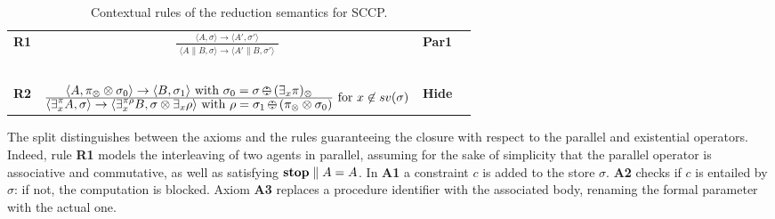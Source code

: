 \documentclass{llncs}
\newcommand{\ostop}{{\bf stop}}
\newcommand{\rarrow}{\rightarrow}
\def\odiv{\, {\ominus\hspace{-7.7pt} \div} \,}
\begin{document}
\begin{table}  %
   \begin{center}
   \begin{tabular}{lcll} 
  \mbox{\bf R1}& $\frac {\displaystyle \langle A, \sigma\rangle \to \langle A', \sigma' \rangle} 
  {\displaystyle \begin{array}{l}
                          \langle A\parallel B, \sigma \rangle \to \langle A'\parallel B, \sigma' \rangle
                          \end{array}}$ 
    & \bf{Par1}&
  \\
  & \mbox{   }&\mbox{   }&
  \\
    \mbox{\bf R2}& $\frac {\displaystyle \langle A, \pi_\otimes \otimes \sigma_0 \rangle
    \to \langle B, \sigma_1 \rangle \text{ with } \sigma_0 = \sigma \odiv (\exists_x \pi)_\otimes}
    {\displaystyle\langle \exists^{\pi}_x A,\sigma\rangle \to \langle 
    \exists^{\pi \rho}_x B, \sigma \otimes \exists_x \rho
    \rangle \text{ with } \rho = \sigma_1 \odiv (\pi_\otimes \otimes \sigma _0)} \text{ for } x \not \in sv(\sigma)$
    &\bf{Hide}&
  \end{tabular}
  \end{center}
\caption{Contextual rules of the reduction semantics for SCCP.}
\label{fig:operational2}
\end{table}

The split distinguishes between the axioms and the rules guaranteeing the closure with respect to the parallel and existential operators. Indeed, rule {\bf  R1} models the interleaving of two agents in parallel, assuming for the sake of simplicity
that the parallel operator is associative and commutative, as well as satisfying $ \hbox{\ostop} \parallel A = A$.
%
%
In {\bf A1} a constraint $c$ is added to the store $\sigma$.
%
{\bf A2} checks if $c$ is entailed by  $\sigma$: if not, the computation is blocked.
%
Axiom {\bf A3} replaces a procedure identifier with the associated body, renaming the formal parameter with the actual one.
%
\end{document}
